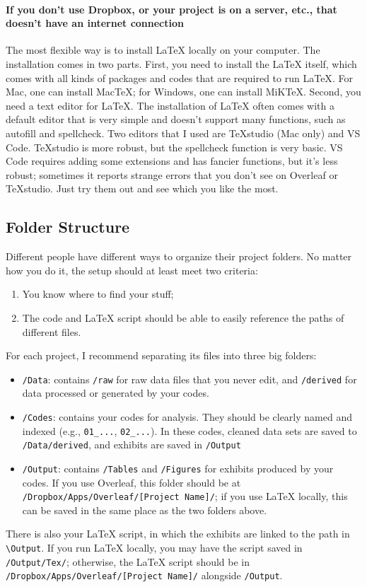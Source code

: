 \paragraph{If you don't use Dropbox, or your project is on a server, etc., that doesn't have an internet connection}
The most flexible way is to install {\LaTeX} locally on your computer. The installation comes in two parts. First, you need to install the {\LaTeX} itself, which comes with all kinds of packages and codes that are required to run {\LaTeX}. For Mac, one can install MacTeX; for Windows, one can install MiKTeX. Second, you need a text editor for {\LaTeX}. The installation of {\LaTeX} often comes with a default editor that is very simple and doesn't support many functions, such as autofill and spellcheck. Two editors that I used are TeXstudio (Mac only) and VS Code. TeXstudio is more robust, but the spellcheck function is very basic. VS Code requires adding some extensions and has fancier functions, but it's less robust; sometimes it reports strange errors that you don't see on Overleaf or TeXstudio. Just try them out and see which you like the most. 

\subsection{Folder Structure}
Different people have different ways to organize their project folders. No matter how you do it, the setup should at least meet two criteria:
\begin{enumerate}
    \item You know where to find your stuff;
    \item The code and {\LaTeX} script should be able to easily reference the paths of different files.
\end{enumerate}
For each project, I recommend separating its files into three big folders: 
\begin{itemize}
    \item \verb|/Data|: contains \verb|/raw| for raw data files that you never edit, and \verb|/derived| for data processed or generated by your codes. 
    \item \verb|/Codes|: contains your codes for analysis. They should be clearly named and indexed (e.g., \verb|01_...|, \verb|02_...|). In these codes, cleaned data sets are saved to \verb|/Data/derived|, and exhibits are saved in \verb|/Output|
    \item \verb|/Output|: contains \verb|/Tables| and \verb|/Figures| for exhibits produced by your codes. If you use Overleaf, this folder should be at \verb|/Dropbox/Apps/Overleaf/[Project Name]/|; if you use {\LaTeX} locally, this can be saved in the same place as the two folders above. 
\end{itemize}
There is also your {\LaTeX} script, in which the exhibits are linked to the path in \verb|\Output|. If you run {\LaTeX} locally, you may have the script saved in \verb|/Output/Tex/|; otherwise, the {\LaTeX} script should be in \verb|/Dropbox/Apps/Overleaf/[Project Name]/| alongside \verb|/Output|. 

